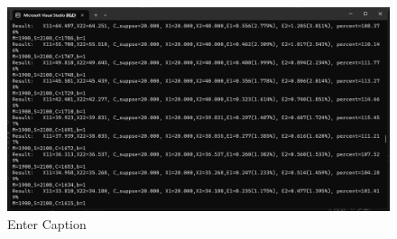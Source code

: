 \documentclass{article}
\begin{document}
\begin{figure}
    \centering
    \includegraphics[width=1\linewidth]{7.png}
    \caption{Enter Caption}
    \label{fig:enter-label}
\end{figure}
\end{document}
